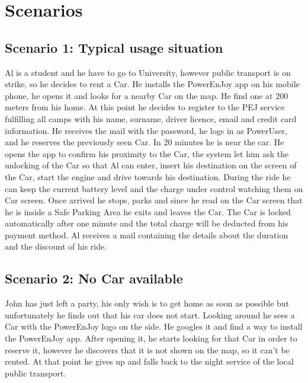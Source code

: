 \section{Scenarios}

\subsection{Scenario 1: Typical usage situation}
Al is a student and he have to go to University, however public transport is on strike, so he decides to rent a Car.  He installs the PowerEnJoy app on his mobile phone, he opens it and looks for a nearby Car on the map. He find one at 200 meters from his home. At this point he decides to register to the PEJ service fulfilling all camps with his name, surname, driver licence, email and credit card information. He receives the mail with the password, he logs in as PowerUser, and he reserves the previously seen Car. In 20 minutes he is near the car. He opens the app to confirm his proximity to the Car, the system let him ask the unlocking of the Car so that Al can enter, insert his destination on the screen of the Car, start the engine and drive towards his destination. During the ride he can keep the current battery level and the charge under control watching them on Car screen. Once arrived he stops, parks and since he read on the Car screen that he is inside a Safe Parking Area he exits and leaves the Car. The Car is locked automatically after one minute and the total charge will be deducted from his payment method. Al receives a mail containing the details about the duration and the discount of his ride.

\subsection{Scenario 2: No Car available}
John has just left a party, his only wish is to get home as soon as possible but unfortunately he finds out that his car does not start. Looking around he sees a Car with the PowerEnJoy logo on the side. He googles it and find a way to install the PowerEnJoy app. After opening it, he starts looking for that Car in order to reserve it, however he discovers that it is not shown on the map, so it can't be rented. At that point he gives up and falls back to the night service of the local public transport.

